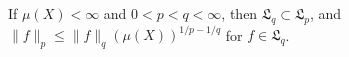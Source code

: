 If $\mu(X) < \infty$ and $0 < p < q < \infty$, then $\mathfrak{L}_q \subset \mathfrak{L}_p$, and $\|f\|_p \leq \|f\|_q (\mu(X))^{1/p - 1/q}$ for $f \in \mathfrak{L}_q$.
